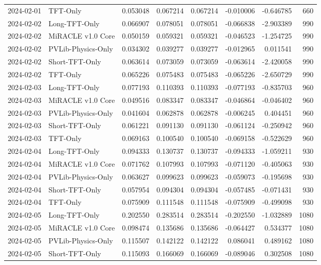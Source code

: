 \begin{tabular}{llrrrrrr}
2024-02-01 & TFT-Only & 0.053048 & 0.067214 & 0.067214 & -0.010006 & -0.646785 & 660 \\
2024-02-02 & Long-TFT-Only & 0.066907 & 0.078051 & 0.078051 & -0.066838 & -2.903389 & 990 \\
2024-02-02 & MiRACLE v1.0 Core & 0.050159 & 0.059321 & 0.059321 & -0.046523 & -1.254725 & 990 \\
2024-02-02 & PVLib-Physics-Only & 0.034302 & 0.039277 & 0.039277 & -0.012965 & 0.011541 & 990 \\
2024-02-02 & Short-TFT-Only & 0.063614 & 0.073059 & 0.073059 & -0.063614 & -2.420058 & 990 \\
2024-02-02 & TFT-Only & 0.065226 & 0.075483 & 0.075483 & -0.065226 & -2.650729 & 990 \\
2024-02-03 & Long-TFT-Only & 0.077193 & 0.110393 & 0.110393 & -0.077193 & -0.835703 & 960 \\
2024-02-03 & MiRACLE v1.0 Core & 0.049516 & 0.083347 & 0.083347 & -0.046864 & -0.046402 & 960 \\
2024-02-03 & PVLib-Physics-Only & 0.041604 & 0.062878 & 0.062878 & -0.006245 & 0.404451 & 960 \\
2024-02-03 & Short-TFT-Only & 0.061221 & 0.091130 & 0.091130 & -0.061124 & -0.250942 & 960 \\
2024-02-03 & TFT-Only & 0.069163 & 0.100540 & 0.100540 & -0.069158 & -0.522629 & 960 \\
2024-02-04 & Long-TFT-Only & 0.094333 & 0.130737 & 0.130737 & -0.094333 & -1.059211 & 930 \\
2024-02-04 & MiRACLE v1.0 Core & 0.071762 & 0.107993 & 0.107993 & -0.071120 & -0.405063 & 930 \\
2024-02-04 & PVLib-Physics-Only & 0.063627 & 0.099623 & 0.099623 & -0.059073 & -0.195698 & 930 \\
2024-02-04 & Short-TFT-Only & 0.057954 & 0.094304 & 0.094304 & -0.057485 & -0.071431 & 930 \\
2024-02-04 & TFT-Only & 0.075909 & 0.111548 & 0.111548 & -0.075909 & -0.499098 & 930 \\
2024-02-05 & Long-TFT-Only & 0.202550 & 0.283514 & 0.283514 & -0.202550 & -1.032889 & 1080 \\
2024-02-05 & MiRACLE v1.0 Core & 0.098474 & 0.135686 & 0.135686 & -0.064427 & 0.534377 & 1080 \\
2024-02-05 & PVLib-Physics-Only & 0.115507 & 0.142122 & 0.142122 & 0.086041 & 0.489162 & 1080 \\
2024-02-05 & Short-TFT-Only & 0.115093 & 0.166069 & 0.166069 & -0.089046 & 0.302508 & 1080 \\

\end{tabular}
